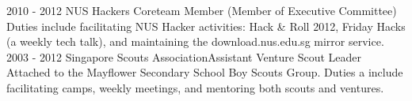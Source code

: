 \documentclass[]{friggeri-cv}
\begin{document}
\begin{entrylist}
	\entry
	{2010 - 2012}
	{NUS Hackers}
	{Coreteam Member (Member of Executive Committee)}
	{
		Duties include facilitating NUS Hacker activities: Hack \& Roll 2012, 
		Friday Hacks (a weekly tech talk), and maintaining the 
		download.nus.edu.sg mirror service.
	}
	\entry
	{2003 - 2012}
	{Singapore Scouts Association}{Assistant Venture Scout Leader}
	{
		Attached to the Mayflower Secondary School Boy Scouts Group. Duties a	
		include facilitating camps, weekly meetings, and mentoring both scouts 
		and ventures.
	}
\end{entrylist}
\end{document}

